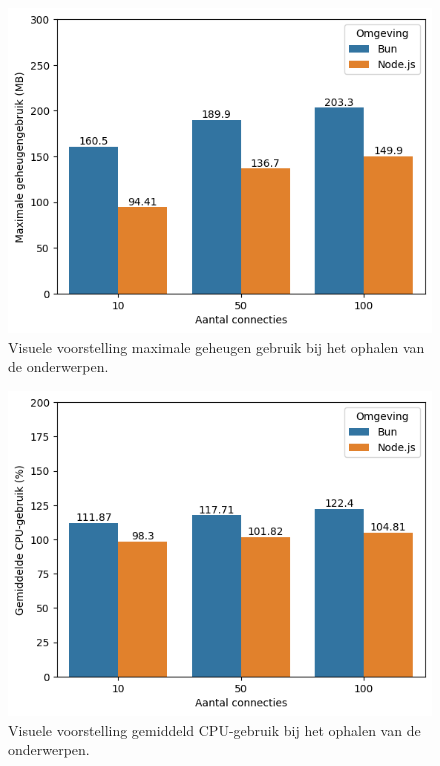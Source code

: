   \begin{figure}[H]
    \centering
    \includegraphics[width=0.7\columnwidth]{graphics/GetPostgresRAM.png}
    \caption{\label{fig:getgeheugenpostgres}Visuele voorstelling maximale geheugen gebruik bij het ophalen van de onderwerpen.}
  \end{figure}
  \begin{figure}[H]
    \centering
    \includegraphics[width=0.7\columnwidth]{graphics/GetPostgresCpu.png}
    \caption{\label{fig:getcpupostgres}Visuele voorstelling gemiddeld CPU-gebruik bij het ophalen van de onderwerpen.}
  \end{figure}

